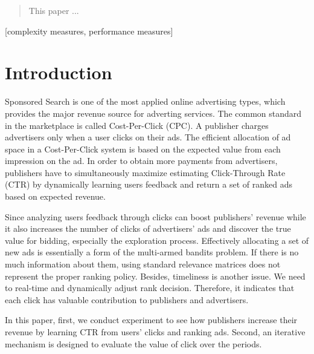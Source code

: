 \documentclass{acm_proc_article-sp}
\begin{document}
\maketitle
\begin{abstract}
This paper ...

\end{abstract}

[complexity measures, performance measures]

\terms{}

\keywords{} %

\section{Introduction}

Sponsored Search is one of the most applied online advertising types, which provides the major revenue source for adverting services. The common standard in the marketplace is called Cost-Per-Click (CPC). A publisher charges advertisers only when a user clicks on their ads. The efficient allocation of ad space in a Cost-Per-Click system is based on the expected value from each impression on the ad. In order to obtain more payments from advertisers, publishers have to simultaneously maximize estimating Click-Through Rate (CTR) by dynamically learning users feedback and return a set of ranked ads based on expected revenue. 

Since analyzing users feedback through clicks can boost publishers' revenue while it also increases the number of clicks of advertisers' ads and discover the true value for bidding, especially the exploration process. Effectively allocating a set of new ads is essentially a form of the multi-armed bandits problem. If there is no much information about them, using standard relevance matrices does not represent the proper ranking policy. Besides, timeliness is another issue. We need to real-time and dynamically adjust rank decision. Therefore, it indicates that each click has valuable contribution to publishers and advertisers. 

In this paper, first, we conduct experiment to see how publishers increase their revenue by learning CTR from users' clicks and ranking ads. Second, an iterative mechanism is designed to evaluate the value of click over the periods.
\end{document}
